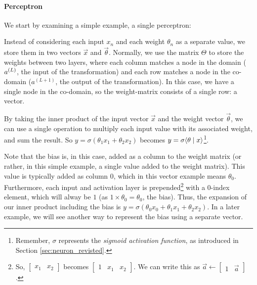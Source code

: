\paragraph{Perceptron}
We start by examining a simple example, a single perceptron:
  \begin{center}
  \end{center}

Instead of considering each input $x_n$ and each weight $\theta_n$ as a separate value, we store them in two vectors $\vec x$ and $\vec\theta$. Normally, we use the matrix $\Theta$ to store the weights between two layers, where each column matches a node in the domain ($a^{(L)}$, the input of the transformation) and each row matches a node in the co-domain ($a^{(L+1)}$, the output of the transformation). In this case, we have a single node in the co-domain, so the weight-matrix consists of a single row: a vector.

By taking the inner product of the input vector $\vec x$ and the weight vector $\vec \theta$, we can use a single operation to multiply each input value with its associated weight, and sum the result. So $y = \sigma(\theta_1x_1 + \theta_2x_2)$ becomes $y = \sigma\langle \theta \mid x \rangle$\footnote{Remember, $\sigma$ represents the \textit{sigmoid activation function}, as introduced in Section \ref{sec:neuron_revisted}.}.

Note that the bias is, in this case, added as a column to the weight matrix (or rather, in this simple example, a single value added to the weight matrix). This value is typically added as column $0$, which in this vector example means $\theta_0$. Furthermore, each input and activation layer is prepended\footnote{So, $\begin{bmatrix}x_1 & x_2\end{bmatrix}$ becomes $\begin{bmatrix}1 & x_1 & x_2\end{bmatrix} $. We can write this as $\vec a \leftarrow \begin{bmatrix}1 & \vec a\end{bmatrix}$.} with a $0$-index element, which will alway be $1$ (as $1 \times \theta_0 = \theta_0$, the bias). Thus, the expansion of our inner product including the bias is $y = \sigma(\theta_0x_0 + \theta_1x_1 + \theta_2x_2)$. In a later example, we will see another way to represent the bias using a separate vector.

